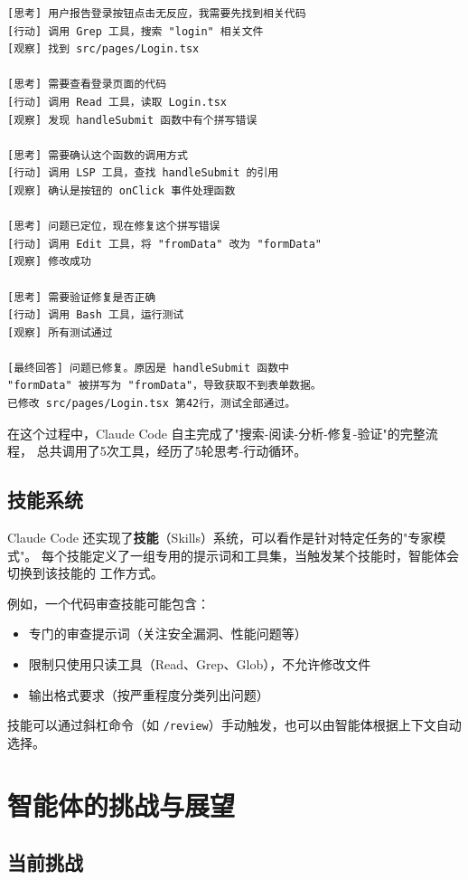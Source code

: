 \begin{verbatim}
[思考] 用户报告登录按钮点击无反应，我需要先找到相关代码
[行动] 调用 Grep 工具，搜索 "login" 相关文件
[观察] 找到 src/pages/Login.tsx

[思考] 需要查看登录页面的代码
[行动] 调用 Read 工具，读取 Login.tsx
[观察] 发现 handleSubmit 函数中有个拼写错误

[思考] 需要确认这个函数的调用方式
[行动] 调用 LSP 工具，查找 handleSubmit 的引用
[观察] 确认是按钮的 onClick 事件处理函数

[思考] 问题已定位，现在修复这个拼写错误
[行动] 调用 Edit 工具，将 "fromData" 改为 "formData"
[观察] 修改成功

[思考] 需要验证修复是否正确
[行动] 调用 Bash 工具，运行测试
[观察] 所有测试通过

[最终回答] 问题已修复。原因是 handleSubmit 函数中
"formData" 被拼写为 "fromData"，导致获取不到表单数据。
已修改 src/pages/Login.tsx 第42行，测试全部通过。
\end{verbatim}

在这个过程中，Claude Code 自主完成了"搜索-阅读-分析-修复-验证"的完整流程，
总共调用了5次工具，经历了5轮思考-行动循环。

\subsection{技能系统}

Claude Code 还实现了\textbf{技能}（Skills）系统，可以看作是针对特定任务的"专家模式"。
每个技能定义了一组专用的提示词和工具集，当触发某个技能时，智能体会切换到该技能的
工作方式。

例如，一个代码审查技能可能包含：
\begin{itemize}
    \item 专门的审查提示词（关注安全漏洞、性能问题等）
    \item 限制只使用只读工具（Read、Grep、Glob），不允许修改文件
    \item 输出格式要求（按严重程度分类列出问题）
\end{itemize}

技能可以通过斜杠命令（如 \texttt{/review}）手动触发，也可以由智能体根据上下文自动选择。

\section{智能体的挑战与展望}

\subsection{当前挑战}

